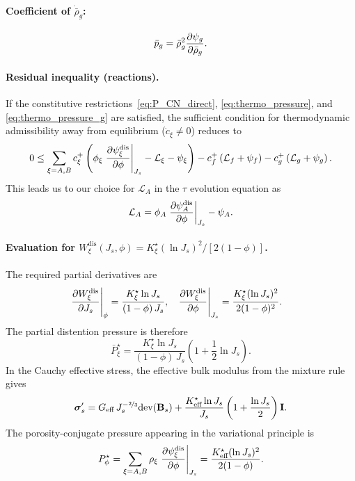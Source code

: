 \paragraph{Coefficient of $\dot{\bar\rho}_g$:}
\begin{align}
  \bar{p}_g = \bar\rho_g^2 \frac{\partial \psi_g}{\partial \bar\rho_g}.
  \label{eq:thermo_pressure_g}
\end{align}

\paragraph{Residual inequality (reactions).}  If the constitutive restrictions~\eqref{eq:P_CN_direct}, \eqref{eq:thermo_pressure}, and \eqref{eq:thermo_pressure_g} are satisfied, the sufficient condition for thermodynamic admissibility away from equilibrium ($\dot{c}_\xi \ne 0$) reduces to
\begin{align}
  0 \leq \sum_{\xi = A, B} c^{+}_\xi \left(\phi_\xi \left.\frac{\partial \psi^\text{dis}_\xi}{\partial \phi}\right\vert_{J_s} - \mathcal{L}_\xi - \psi_\xi\right) - c^{+}_f \left(\mathcal{L}_f + \psi_f\right) - c_g^+ \left(\mathcal{L}_g + \psi_g\right).
  \label{eq:thermo_reaction}
\end{align}
This leads us to our choice for $\mathcal{L}_A$ in the $\tau$ evolution equation as
\begin{align}
 \mathcal{L}_A = \phi_A \left.\frac{\partial \psi^\text{dis}_A}{\partial \phi}\right\vert_{J_s} - \psi_A.
\end{align}

\paragraph{Evaluation for $W^{\text{dis}}_\xi(J_s, \phi) = K^\star_\xi (\ln J_s)^2 / [2(1-\phi)]$.}  The required partial derivatives are
\begin{align}
  \left.\frac{\partial W^{\text{dis}}_\xi}{\partial J_s}\right\vert_\phi &= \frac{K^\star_\xi \ln J_s}{(1-\phi)\,J_s}, &
  \left.\frac{\partial W^{\text{dis}}_\xi}{\partial \phi}\right\vert_{J_s} &= \frac{K^\star_\xi (\ln J_s)^2}{2(1-\phi)^2}.
  \label{eq:Wdis_partials}
\end{align}
The partial distention pressure is therefore
\begin{equation}
  \bar{P}^\star_\xi = \frac{K^\star_\xi \ln J_s}{(1-\phi)\,J_s}\left(1 + \frac{1}{2}\ln J_s\right).
  \label{eq:Pstar_explicit}
\end{equation}
In the Cauchy effective stress, the effective bulk modulus from the mixture rule gives
\begin{equation}
  \boldsymbol{\sigma}'_s = G_{\text{eff}}\, J_s^{-\nicefrac{2}{3}} \mbox{dev}(\mathbf{B}_s) + \frac{K^\star_{\text{eff}} \ln J_s}{J_s}\left(1 + \frac{\ln J_s}{2}\right) \mathbf{I}.
  \label{eq:sigma_CN_explicit}
\end{equation}
The porosity-conjugate pressure appearing in the variational principle is
\begin{equation}
  P^\star_\phi = \sum_{\xi=A,B} \rho_\xi \left.\frac{\partial \psi^{\text{dis}}_\xi}{\partial \phi}\right\vert_{J_s} = \frac{K^\star_{\text{eff}} (\ln J_s)^2}{2(1-\phi)}.
  \label{eq:Pstar_phi_explicit}
\end{equation}
